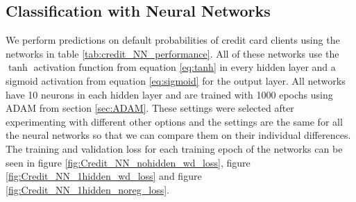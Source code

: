 \subsection{Classification with Neural Networks}\label{sec:clas_w_nn}
We perform predictions on default probabilities of credit card clients using the networks in table \ref{tab:credit_NN_performance}. All of these networks use the $\tanh$ activation function from equation \ref{eq:tanh} in every hidden layer and a sigmoid activation from equation \ref{eq:sigmoid} for the output layer. All networks have 10 neurons in each hidden layer and are trained with 1000 epochs using ADAM from section \ref{sec:ADAM}. These settings were selected after experimenting with different other options and the settings are the same for all the neural networks so that we can compare them on their individual differences. The training and validation loss for each training epoch of the networks can be seen in figure \ref{fig:Credit_NN_nohidden_wd_loss}, figure \ref{fig:Credit_NN_1hidden_wd_loss} and figure \ref{fig:Credit_NN_1hidden_noreg_loss}.\\




